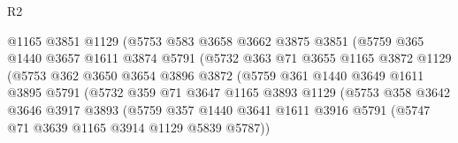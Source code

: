 \begin{lexlean}{R2}
\begin{coremodule}
                                @1165
                                @3851
                                @1129
                                (@5753
                                  @583
                                  @3658
                                  @3662
                                  @3875
                                  @3851
                                  (@5759
                                    @365
                                    @1440
                                    @3657
                                    @1611
                                    @3874
                                    @5791
                                    (@5732
                                      @363
                                      @71
                                      @3655
                                      @1165
                                      @3872
                                      @1129
                                      (@5753
                                        @362
                                        @3650
                                        @3654
                                        @3896
                                        @3872
                                        (@5759
                                          @361
                                          @1440
                                          @3649
                                          @1611
                                          @3895
                                          @5791
                                          (@5732
                                            @359
                                            @71
                                            @3647
                                            @1165
                                            @3893
                                            @1129
                                            (@5753
                                              @358
                                              @3642
                                              @3646
                                              @3917
                                              @3893
                                              (@5759
                                                @357
                                                @1440
                                                @3641
                                                @1611
                                                @3916
                                                @5791
                                                (@5747 @71 @3639 @1165 @3914 @1129 @5839 @5787))

\end{coremodule}
\end{lexlean}
